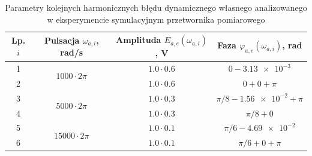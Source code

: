 \begin{table}[htb!]
\begin{center}
\caption{Parametry kolejnych harmonicznych błędu dynamicznego własnego analizowanego w eksperymencie symulacyjnym przetwornika pomiarowego \label{tab_sym_parta_params_dyn_list}}
\begin{tabular}[c]{| c | c | c | c |} \hline
\textbf{Lp. $i$} & \textbf{Pulsacja $\omega_{a,i}$, rad/s} & \textbf{Amplituda $E_{a,e}(\omega_{a,i})$, V} & \textbf{Faza $\varphi_{a,e}(\omega_{a,i})$, rad} \\ \hline
1 & \multirow{2}{*}{$1000  \cdot 2\pi$} &  $1.0 \cdot 0.6$       & $0 - \num{3.13e-3}$            \\ \cline{1-1} \cline{3-4}
2 &                                     &  $1.0 \cdot 0.6$       & $0 + 0 + \pi$                  \\ \hline
3 & \multirow{2}{*}{$5000  \cdot 2\pi$} &  $1.0 \cdot 0.3$       & $\pi/8 - \num{1.56e-2} + \pi$  \\ \cline{1-1} \cline{3-4}
4 &                                     &  $1.0 \cdot 0.3$       & $\pi/8 + 0$                    \\ \hline
5 & \multirow{2}{*}{$15000 \cdot 2\pi$} &  $1.0 \cdot 0.1$       & $\pi/6 - \num{4.69e-2}$        \\ \cline{1-1} \cline{3-4}
6 &                                     &  $1.0 \cdot 0.1$       & $\pi/6 + 0 +\pi$               \\ \hline
\end{tabular}
\end{center}
\end{table}

